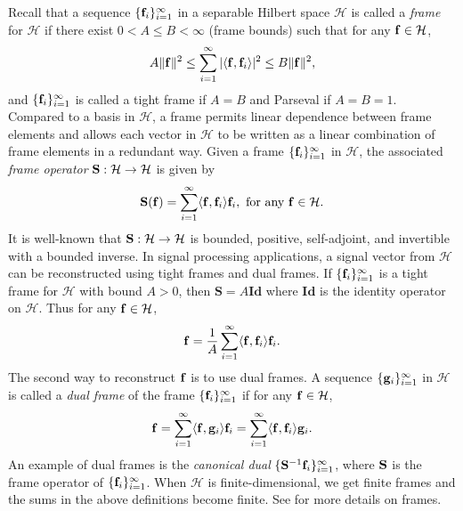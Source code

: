 \documentclass{amsart}
\numberwithin{equation}{section}
\theoremstyle{plain}
\theoremstyle{definition}
\begin{document}
Recall that a sequence $\{{\bf f}_i\}_{i=1}^\infty$ in a separable Hilbert space $\mathcal{H}$ is called a \textit{frame} for $\mathcal{H}$ if  there exist $0<A \leq B < \infty$ (frame bounds) such that for any ${\bf f} \in \mathcal{H}$, 
\begin{equation*}
    A \Vert {\bf f}  \Vert^2 \leq\sum_{i =1}^{\infty} \vert \langle {\bf f},{\bf f}_i \rangle \vert ^2  \leq B\Vert {\bf f} \Vert^2,
\end{equation*} 
and $\{{\bf f}_i\}_{i=1}^\infty$ is called a tight frame if $A = B$ and Parseval if $A = B=1$. 
Compared to a basis in $\mathcal{H}$, a frame permits linear dependence between frame elements and allows each vector in $\mathcal{H}$ to be written as a linear combination of frame elements in a redundant way. Given a frame $\{{\bf f}_i\}_{i=1}^\infty$ in $\mathcal{H}$, the associated \textit{frame operator} ${\bf S}: \mathcal{H} \rightarrow \mathcal{H}$ is given by 
\begin{equation*}
     {\bf S}({\bf f}) = \sum_{i =1}^{\infty}  \langle {\bf f},{\bf f}_i \rangle  {\bf f}_i, \ \text{for any} \ {\bf f} \in \mathcal{H}.
\end{equation*}
It is well-known that ${\bf S}: \mathcal{H} \rightarrow \mathcal{H}$ is bounded, positive, self-adjoint, and invertible with a bounded inverse. In signal processing applications, a signal vector from $\mathcal{H}$ can be reconstructed using tight frames and dual frames. If $\{{\bf f}_i\}_{i=1}^\infty$ is a tight frame for $\mathcal{H}$ with bound $A>0$, then $\mathbf{S} =A \mathbf{Id}$ where $\mathbf{Id}$ is the identity operator on $\mathcal{H}$.   Thus for any ${\bf f} \in \mathcal{H}$, 
$${\bf f} = \frac{1}{A} \sum\limits_{i =1}^{\infty} \langle {\bf f},{\bf f}_i \rangle  {\bf f}_i.$$
The second way to reconstruct ${\bf f}$ is to use dual frames. A sequence $\{{\bf g}_i\}_{i=1}^\infty$ in $\mathcal{H}$ is called a \textit{dual frame} of the frame $\{{\bf f}_i\}_{i=1}^\infty$ if for any ${\bf f} \in \mathcal{H}$, 
\begin{equation*}
   {\bf f} = \sum_{i =1}^{\infty}  \langle {\bf f},{\bf g}_i \rangle  {\bf f}_i   = \sum_{i =1}^{\infty}  \langle {\bf f},{\bf f}_i \rangle  {\bf g}_i.
\end{equation*}
An example of dual frames is the \emph{canonical dual} $\{{\bf S}^{-1}{\bf f}_i\}_{i=1}^\infty$, where ${\bf S}$ is the frame operator of $\{{\bf f}_i\}_{i=1}^\infty$. When $\mathcal{H}$ is finite-dimensional, we get finite frames and the sums in the above definitions become finite. See \cite{christensen2016introduction} for more details on frames.
\end{document}
